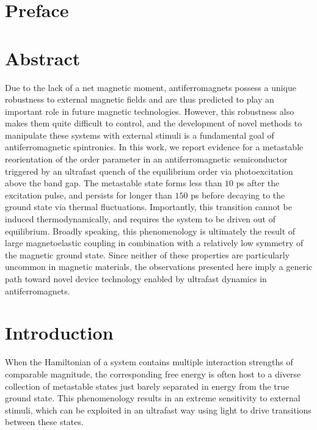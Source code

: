 \section{Preface}

\section{Abstract}

Due to the lack of a net magnetic moment, antiferromagnets possess a unique robustness to external magnetic fields and are thus predicted to play an important role in future magnetic technologies.
However, this robustness also makes them quite difficult to control, and the development of novel methods to manipulate these systems with external stimuli is a fundamental goal of antiferromagnetic spintronics.
In this work, we report evidence for a metastable reorientation of the order parameter in an antiferromagnetic semiconductor triggered by an ultrafast quench of the equilibrium order via photoexcitation above the band gap.
The metastable state forms less than $10$ \si{ps} after the excitation pulse, and persists for longer than $150$ \si{ps} before decaying to the ground state via thermal fluctuations.
Importantly, this transition cannot be induced thermodynamically, and requires the system to be driven out of equilibrium.
Broadly speaking, this phenomenology is ultimately the result of large magnetoelastic coupling in combination with a relatively low symmetry of the magnetic ground state.
Since neither of these properties are particularly uncommon in magnetic materials, the observations presented here imply a generic path toward novel device technology enabled by ultrafast dynamics in antiferromagnets.

\section{Introduction}

When the Hamiltonian of a system contains multiple interaction strengths of comparable magnitude, the corresponding free energy is often host to a diverse collection of metastable states just barely separated in energy from the true ground state.
This phenomenology results in an extreme sensitivity to external stimuli\citep{zhang_dynamics_2014,basov_electrodynamics_2011,dagotto_complexity_2005}, which can be exploited in an ultrafast way using light to drive transitions between these states\citep{basov_towards_2017,kogar_light-induced_2020,mitrano_possible_2016,fausti_light-induced_2011}.

